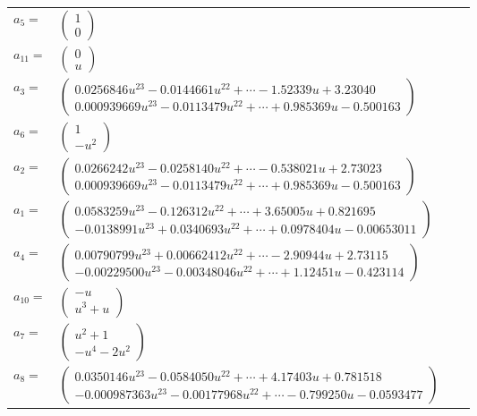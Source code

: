 \documentclass[1p]{elsarticle_modified}
\theoremstyle{definition}
\begin{document}
\begin{tabular}{m{7pt} m{180pt} m{7pt} m{180pt} }
\flushright $a_{5}=$&$\begin{pmatrix}1\\0\end{pmatrix}$ \\
\flushright $a_{11}=$&$\begin{pmatrix}0\\u\end{pmatrix}$ \\
\flushright $a_{3}=$&$\begin{pmatrix}0.0256846 u^{23}-0.0144661 u^{22}+\cdots-1.52339 u+3.23040\\0.000939669 u^{23}-0.0113479 u^{22}+\cdots+0.985369 u-0.500163\end{pmatrix}$ \\
\flushright $a_{6}=$&$\begin{pmatrix}1\\- u^2\end{pmatrix}$ \\
\flushright $a_{2}=$&$\begin{pmatrix}0.0266242 u^{23}-0.0258140 u^{22}+\cdots-0.538021 u+2.73023\\0.000939669 u^{23}-0.0113479 u^{22}+\cdots+0.985369 u-0.500163\end{pmatrix}$ \\
\flushright $a_{1}=$&$\begin{pmatrix}0.0583259 u^{23}-0.126312 u^{22}+\cdots+3.65005 u+0.821695\\-0.0138991 u^{23}+0.0340693 u^{22}+\cdots+0.0978404 u-0.00653011\end{pmatrix}$ \\
\flushright $a_{4}=$&$\begin{pmatrix}0.00790799 u^{23}+0.00662412 u^{22}+\cdots-2.90944 u+2.73115\\-0.00229500 u^{23}-0.00348046 u^{22}+\cdots+1.12451 u-0.423114\end{pmatrix}$ \\
\flushright $a_{10}=$&$\begin{pmatrix}- u\\u^3+u\end{pmatrix}$ \\
\flushright $a_{7}=$&$\begin{pmatrix}u^2+1\\- u^4-2 u^2\end{pmatrix}$ \\
\flushright $a_{8}=$&$\begin{pmatrix}0.0350146 u^{23}-0.0584050 u^{22}+\cdots+4.17403 u+0.781518\\-0.000987363 u^{23}-0.00177968 u^{22}+\cdots-0.799250 u-0.0593477\end{pmatrix}$ \\

\end{tabular}
\end{document}
